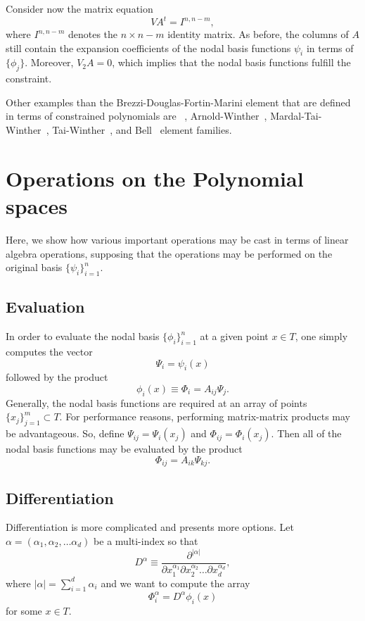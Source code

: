 Consider now the matrix
equation
\begin{equation}
\label{eq:extendedvdmsystem}
V A^t = I^{n,n-m},
\end{equation}
where \( I^{n,n-m} \) denotes the \( n \times n-m \) identity matrix.  
As before, the columns of \( A \) still
contain the expansion coefficients of the nodal basis functions
\( \psi_i \) in terms of \( \{ \phi_j \} \).
Moreover, \( V_2 A = 0 \), which implies that the nodal basis functions
fulfill the constraint. 

Other examples than the Brezzi-Douglas-Fortin-Marini element 
that are defined in terms of constrained polynomials are 
\nedelec~\citep{Nedelec1980}, Arnold-Winther~\citep{ArnoldWinther2002},
Mardal-Tai-Winther~\citep{MardalTaiWinther2002}, 
Tai-Winther~\citep{TaiWinther2006}, and Bell~\citep{Ciarlet2002} element families.


\section{Operations on the Polynomial spaces}
Here, we show how various important operations may be cast
in terms of linear algebra operations, supposing that the operations may be performed on
the original basis \( \{ \psi_i \}_{i=1}^{n} \).

\subsection{Evaluation}
In order to evaluate the nodal basis \( \{ \phi_i \}_{i=1}^{n} \)
at a given point \( x \in T \), one simply computes the vector
\begin{equation}
\Psi_i = \psi_i(x)
\end{equation}
followed by the product
\begin{equation}
\phi_i(x) \equiv \Phi_i = A_{ij} \Psi_j.
\end{equation}
Generally, the nodal basis functions are required at an array of
points \( \{ x_j \}_{j=1}^{m} \subset T \).  For performance reasons,
performing matrix-matrix products may be advantageous.  So, define
\( \Psi_{ij} = \Psi_i(x_j) \)  and \( \Phi_{ij} = \Phi_i(x_j) \).
Then all of the nodal basis functions may be evaluated by the
product
\begin{equation}
\Phi_{ij} = A_{ik} \Psi_{kj}.
\end{equation}
\subsection{Differentiation}
Differentiation is more complicated and presents more options.
Let \( \alpha = ( \alpha_1 , \alpha_2 , \dots \alpha_d ) \) be a
multi-index so that
\begin{equation}
D^\alpha \equiv \frac{\partial^{|\alpha|}}{\partial
  x_1^{\alpha_1} \partial x_2^{\alpha_2} \dots \partial x_d^{\alpha_d}},
\end{equation}
where \( |\alpha| = \sum_{i=1}^{d} \alpha_i \) and we want 
to compute the array
\begin{equation}
\Phi^\alpha_i = D^\alpha \phi_i(x)
\end{equation}
for some \( x \in T \).

